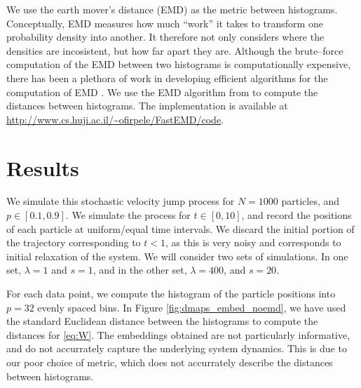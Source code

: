 \documentclass[prl, reprint, final]{revtex4-1}
\begin{document}
We use the earth mover's distance (EMD) \cite{rubner2000earth} as the metric between histograms.
%
Conceptually, EMD measures how much ``work'' it takes to transform one probability density into another.
%
It therefore not only considers where the densities are incosistent, but how far apart they are.
%
Although the brute--force computation of the EMD between two histograms is computationally expensive, there has been a plethora of work in developing efficient algorithms for the computation of EMD \cite{...}.
%
%
We use the EMD algorithm from \cite{Pele-eccv2008, Pele-iccv2009} to compute the distances between histograms.
%
The implementation is available at \url{http://www.cs.huji.ac.il/~ofirpele/FastEMD/code}. 

\section{Results}

We simulate this stochastic velocity jump process for $N=1000$ particles, and $p \in [0.1, 0.9]$.
%
We simulate the process for $t \in [0, 10]$, and record the positions of each particle at uniform/equal time intervals.
%
We discard the initial portion of the trajectory corresponding to $t < 1$, as this is very noisy and corresponds to initial relaxation of the system.
%
We will consider two sets of simulations.
%
In one set, $\lambda = 1$ and $s=1$, and in the other set, $\lambda = 400$, and $s=20$.

For each data point, we compute the histogram of the particle positions into $p=32$ evenly spaced bins. 
%
In Figure \ref{fig:dmaps_embed_noemd}, we have used the standard Euclidean distance between the histograms to compute the distances for \eqref{eq:W}.
%
The embeddings obtained are not particularly informative, and do not accurrately capture the underlying system dynamics.
%
This is due to our poor choice of metric, which does not accurrately describe the distances between histograms.
\end{document}
